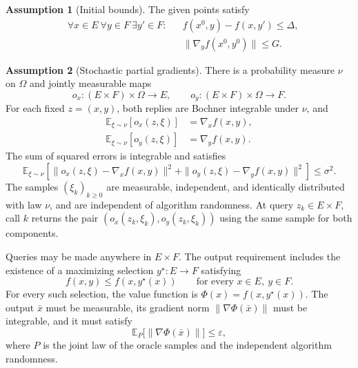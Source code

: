 \documentclass[10pt]{article}
\theoremstyle{definition}
\newtheorem{assumption}{Assumption}
\begin{document}
\begin{assumption}[Initial bounds]
The given points satisfy
\[
\begin{aligned}
&\forall x\in E\ \forall y\in F\ \exists y'\in F:
&&f(x^0,y)-f(x,y')\leq\Delta,\\
&&&\|\nabla_y f(x^0,y^0)\|\leq G.
\end{aligned}
\]
\end{assumption}

\begin{assumption}[Stochastic partial gradients]
There is a probability measure $\nu$ on $\Omega$ and jointly measurable maps
\[
o_x:(E\times F)\times\Omega\to E,
\qquad
o_y:(E\times F)\times\Omega\to F.
\]
For each fixed $z=(x,y)$, both replies are Bochner integrable under $\nu$, and
\[
\begin{aligned}
\mathbb{E}_{\xi\sim\nu}[o_x(z,\xi)]&=\nabla_x f(x,y),\\
\mathbb{E}_{\xi\sim\nu}[o_y(z,\xi)]&=\nabla_y f(x,y).
\end{aligned}
\]
The sum of squared errors is integrable and satisfies
\[
\mathbb{E}_{\xi\sim\nu}\!\left[
\|o_x(z,\xi)-\nabla_x f(x,y)\|^2
+\|o_y(z,\xi)-\nabla_y f(x,y)\|^2
\right]\leq\sigma^2.
\]
The samples $(\xi_k)_{k\geq0}$ are measurable, independent, and identically distributed with law $\nu$, and are independent of algorithm randomness. At query $z_k\in E\times F$, call $k$ returns the pair $(o_x(z_k,\xi_k),o_y(z_k,\xi_k))$ using the same sample for both components.
\end{assumption}

Queries may be made anywhere in $E\times F$. The output requirement includes the existence of a maximizing selection $y^\star:E\to F$ satisfying
\[
f(x,y)\leq f(x,y^\star(x))
\qquad\text{for every }x\in E,\ y\in F.
\]
For every such selection, the value function is $\Phi(x)=f(x,y^\star(x))$. The output $\bar{x}$ must be measurable, its gradient norm $\|\nabla\Phi(\bar{x})\|$ must be integrable, and it must satisfy
\[
\mathbb{E}_{P}\bigl[\|\nabla\Phi(\bar{x})\|\bigr]\leq\varepsilon,
\]
where $P$ is the joint law of the oracle samples and the independent algorithm randomness.
\end{document}
